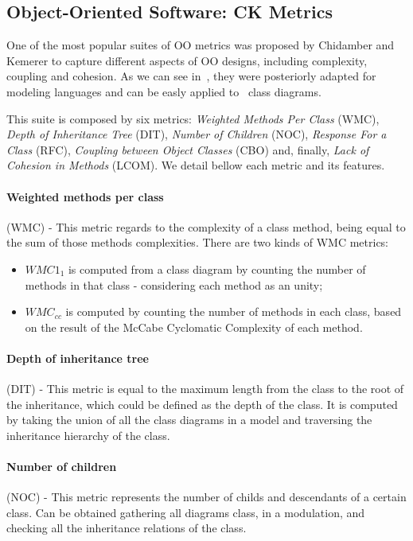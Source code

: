 \subsection{Object-Oriented Software: \textrm{CK} Metrics}
One of the most popular suites of OO metrics was proposed by Chidamber and Kemerer \cite{Chidamber:1994:MSO:630808.631131} to capture different aspects of OO designs, including complexity, coupling and cohesion. 
As we can see in~\cite{Power2}, they were posteriorly adapted for modeling languages and can be easly applied to \uml\ class diagrams.

This suite is composed by six metrics: \emph{Weighted Methods Per Class} (WMC), \emph{Depth of Inheritance Tree} (DIT), \emph{Number of Children} (NOC), \emph{Response For a Class} (RFC), \emph{Coupling between Object Classes} (CBO) and, finally, \emph{Lack of Cohesion in Methods} (LCOM).
We detail bellow each metric and its features.

\paragraph{Weighted methods per class} (WMC) - This metric regards to the complexity of a class method, being equal to the sum of those methods complexities. There are two kinds of WMC metrics:
\begin{itemize}
\item \textbf{$WMC1_{1}$} is computed from a class diagram by counting the number of methods in that class - considering each method as an unity;
\item \textbf{$WMC_{cc}$} is computed by counting the number of methods in each class, based on the result of the McCabe Cyclomatic Complexity of each method.
\end{itemize}

\paragraph{Depth of inheritance tree} (DIT) - This metric is equal to the maximum length from the class to the root of the inheritance, which could be defined as the depth of the class. It is computed by taking the union of all the class diagrams in a \umlS model and traversing the inheritance hierarchy of the class.

\paragraph{Number of children} (NOC) - This metric represents the number of childs and descendants of a certain class. Can be obtained gathering all diagrams class, in a \umlS modulation, and checking all the inheritance relations of the class.

